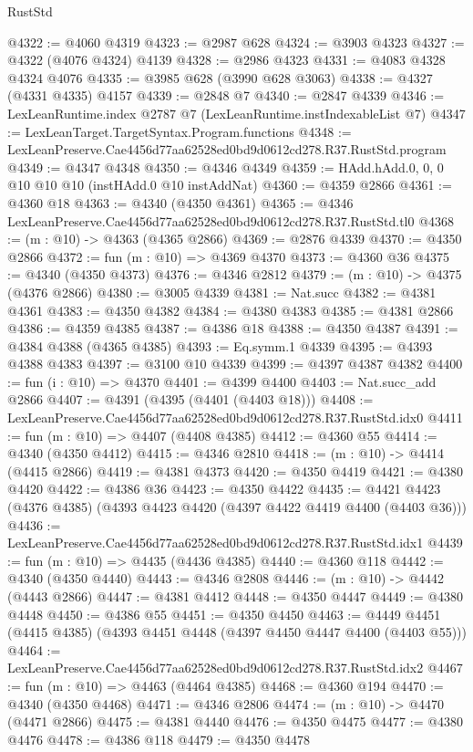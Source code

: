 \begin{lexlean}{RustStd}
\begin{coremodule}
@4322 := @4060 @4319
@4323 := @2987 @628
@4324 := @3903 @4323
@4327 := @4322 (@4076 @4324) @4139
@4328 := @2986 @4323
@4331 := @4083 @4328 @4324 @4076
@4335 := @3985 @628 (@3990 @628 @3063)
@4338 := @4327 (@4331 @4335) @4157
@4339 := @2848 @7
@4340 := @2847 @4339
@4346 := LexLeanRuntime.index @2787 @7 (LexLeanRuntime.instIndexableList @7)
@4347 := LexLeanTarget.TargetSyntax.Program.functions
@4348 := LexLeanPreserve.Cae4456d77aa62528ed0bd9d0612cd278.R37.RustStd.program
@4349 := @4347 @4348
@4350 := @4346 @4349
@4359 := HAdd.hAdd.{0, 0, 0} @10 @10 @10 (instHAdd.{0} @10 instAddNat)
@4360 := @4359 @2866
@4361 := @4360 @18
@4363 := @4340 (@4350 @4361)
@4365 := @4346 LexLeanPreserve.Cae4456d77aa62528ed0bd9d0612cd278.R37.RustStd.tl0
@4368 := (m : @10) -> @4363 (@4365 @2866)
@4369 := @2876 @4339
@4370 := @4350 @2866
@4372 := fun (m : @10) => @4369 @4370
@4373 := @4360 @36
@4375 := @4340 (@4350 @4373)
@4376 := @4346 @2812
@4379 := (m : @10) -> @4375 (@4376 @2866)
@4380 := @3005 @4339
@4381 := Nat.succ
@4382 := @4381 @4361
@4383 := @4350 @4382
@4384 := @4380 @4383
@4385 := @4381 @2866
@4386 := @4359 @4385
@4387 := @4386 @18
@4388 := @4350 @4387
@4391 := @4384 @4388 (@4365 @4385)
@4393 := Eq.symm.{1} @4339
@4395 := @4393 @4388 @4383
@4397 := @3100 @10 @4339
@4399 := @4397 @4387 @4382
@4400 := fun (i : @10) => @4370
@4401 := @4399 @4400
@4403 := Nat.succ_add @2866
@4407 := @4391 (@4395 (@4401 (@4403 @18)))
@4408 := LexLeanPreserve.Cae4456d77aa62528ed0bd9d0612cd278.R37.RustStd.idx0
@4411 := fun (m : @10) => @4407 (@4408 @4385)
@4412 := @4360 @55
@4414 := @4340 (@4350 @4412)
@4415 := @4346 @2810
@4418 := (m : @10) -> @4414 (@4415 @2866)
@4419 := @4381 @4373
@4420 := @4350 @4419
@4421 := @4380 @4420
@4422 := @4386 @36
@4423 := @4350 @4422
@4435 := @4421 @4423 (@4376 @4385) (@4393 @4423 @4420 (@4397 @4422 @4419 @4400 (@4403 @36)))
@4436 := LexLeanPreserve.Cae4456d77aa62528ed0bd9d0612cd278.R37.RustStd.idx1
@4439 := fun (m : @10) => @4435 (@4436 @4385)
@4440 := @4360 @118
@4442 := @4340 (@4350 @4440)
@4443 := @4346 @2808
@4446 := (m : @10) -> @4442 (@4443 @2866)
@4447 := @4381 @4412
@4448 := @4350 @4447
@4449 := @4380 @4448
@4450 := @4386 @55
@4451 := @4350 @4450
@4463 := @4449 @4451 (@4415 @4385) (@4393 @4451 @4448 (@4397 @4450 @4447 @4400 (@4403 @55)))
@4464 := LexLeanPreserve.Cae4456d77aa62528ed0bd9d0612cd278.R37.RustStd.idx2
@4467 := fun (m : @10) => @4463 (@4464 @4385)
@4468 := @4360 @194
@4470 := @4340 (@4350 @4468)
@4471 := @4346 @2806
@4474 := (m : @10) -> @4470 (@4471 @2866)
@4475 := @4381 @4440
@4476 := @4350 @4475
@4477 := @4380 @4476
@4478 := @4386 @118
@4479 := @4350 @4478

\end{coremodule}
\end{lexlean}
